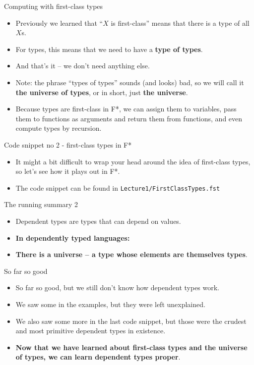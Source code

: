 \documentclass{beamer}
\newcommand{\m}[1]{\texttt{#1}}
\begin{document}
\begin{frame}{Computing with first-class types}
\begin{itemize}
	\item Previously we learned that ``$X$ is first-class'' means that there is a type of all $X$s.
	\item For types, this means that we need to have a \textbf{type of types}.
	\item And that's it -- we don't need anything else.
	\item Note: the phrase ``types of types'' sounds (and looks) bad, so we will call it \textbf{the universe of types}, or in short, just \textbf{the universe}.
	\item Because types are first-class in F*, we can assign them to variables, pass them to functions as arguments and return them from functions, and even compute types by recursion.
\end{itemize}
\end{frame}

\begin{frame}{Code snippet no 2 - first-class types in F*}
\begin{itemize}
	\item It might a bit difficult to wrap your head around the idea of first-class types, so let's see how it plays out in F*.
	\item The code snippet can be found in \m{Lecture1/FirstClassTypes.fst}
\end{itemize}
\end{frame}

\begin{frame}{The running summary 2}
\begin{itemize}
	\item Dependent types are types that can depend on values.
	\item \textbf{In dependently typed languages:}
	\item \textbf{There is a universe -- a type whose elements are themselves types}.
\end{itemize}
\end{frame}

\begin{frame}{So far so good}
\begin{itemize}
	\item So far so good, but we still don't know how dependent types work.
	\item We saw some in the examples, but they were left unexplained.
	\item We also saw some more in the last code snippet, but those were the crudest and most primitive dependent types in existence.
	\item \textbf{Now that we have learned about first-class types and the universe of types, we can learn dependent types proper}.
\end{itemize}
\end{frame}
\end{document}

